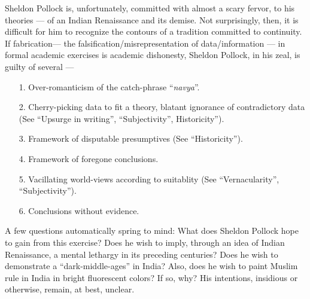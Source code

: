 Sheldon Pollock is, unfortunately, committed with almost a scary fervor, to his theories — of an Indian Renaissance and its demise. Not surprisingly, then, it is difficult for him to recognize the contours of a tradition committed to continuity. If fabrication— the falsification/misrepresentation of data/information —  in formal academic exercises is academic dishonesty, Sheldon Pollock, in his zeal, is guilty of several — 
\begin{itemize}
\itemsep=1pt
\item[1.] Over-romanticism of the catch-phrase “{\sl navya}”.
\item[2.] Cherry-picking data to fit a theory, blatant ignorance of contradictory data (See “Upsurge in writing”, “Subjectivity”, Historicity”).
\item[3.] Framework of disputable presumptives (See “Historicity”).
\item[4.] Framework of foregone conclusions. 
\item[5.] Vacillating world-views according to suitablity (See “Vernacularity”, “Subjectivity”).
\item[6.] Conclusions without evidence.
\end{itemize}

A few questions automatically spring to mind: What does Sheldon Pollock hope to gain from this exercise? Does he wish to imply, through an idea of Indian Renaissance, a mental lethargy in its preceding centuries? Does he wish to demonstrate a “dark-middle-ages” in India? Also, does he wish to paint Muslim rule in India in bright fluorescent colors? If so, why? His intentions, insidious or otherwise, remain, at best, unclear. 


